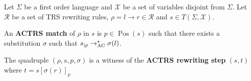 \documentclass{book}
\begin{document}
\begin{definition}
  \label{def:trs:actrs}
  Let $\Sigma$ be a first order language and $\mathcal{X}$ be a set of variables disjoint from $\Sigma$.
  Let $\mathcal{R}$ be a set of TRS rewriting rules, $\rho \mathop{=} l \mathop{\to} r \mathop{\in} \mathcal{R}$ and $s \mathop{\in} T(\Sigma, \mathcal{X})$.

  An \textbf{ACTRS match} of $\rho$ in $s$ is $p \mathop{\in} \operatorname{Pos}(s)$ such that there exists a substitution $\sigma$ such that $s_{|p} \rightarrow_{\operatorname{AC}}^* \sigma(l)$. 


  The quadruple $(\rho, s, p, \sigma)$ is a witness of the \textbf{ACTRS rewriting step} $(s, t)$ where $t \mathop{=} s[\sigma(r)]_p$

\end{definition}

   

 
\end{document}

